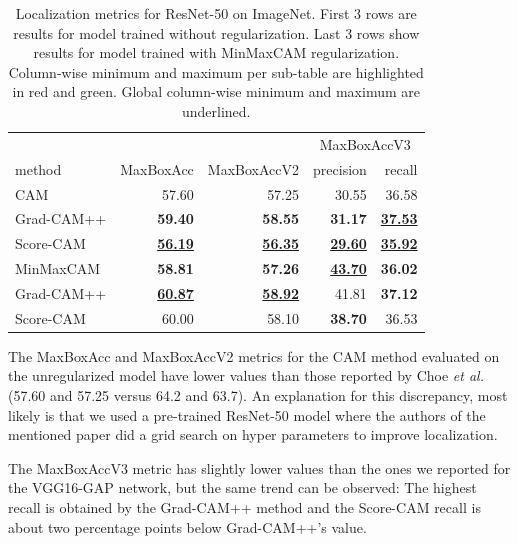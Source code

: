 \begin{table}[h]
\centering
\begin{tabular}{lrrrr}
\toprule
 & & & \multicolumn{2}{c}{MaxBoxAccV3} \\
method & MaxBoxAcc & MaxBoxAccV2 & precision & recall \\
\cmidrule(lr){1-1} \cmidrule(lr){2-5}
CAM & 57.60 & 57.25 & 30.55 & 36.58 \\
Grad-CAM++ & \color{teal} \bfseries 59.40 & \color{teal} \bfseries 58.55 & \color{teal} \bfseries 31.17 & \color{teal} \bfseries \underline{37.53} \\
Score-CAM & \color{purple} \bfseries \underline{56.19} & \color{purple} \bfseries \underline{56.35} & \color{purple} \bfseries \underline{29.60} & \color{purple} \bfseries \underline{35.92} \\
\cmidrule(lr){1-1} \cmidrule(lr){2-5}
MinMaxCAM & \color{purple} \bfseries 58.81 & \color{purple} \bfseries 57.26 & \color{teal} \bfseries \underline{43.70} & \color{purple} \bfseries 36.02 \\
Grad-CAM++ & \color{teal} \bfseries \underline{60.87} & \color{teal} \bfseries \underline{58.92} & 41.81 & \color{teal} \bfseries 37.12 \\
Score-CAM & 60.00 & 58.10 & \color{purple} \bfseries 38.70 & 36.53 \\
\bottomrule
\end{tabular}
\caption[Localization metrics for ResNet-50 on ImageNet]{Localization metrics for ResNet-50 on ImageNet. First 3 rows are results for model trained without regularization. Last 3 rows show results for model trained with MinMaxCAM regularization. Column-wise minimum and maximum per sub-table are highlighted in red and green. Global column-wise minimum and maximum are underlined.}
\label{tab:metrics_resnet50_imagenet}
\end{table}

The MaxBoxAcc and MaxBoxAccV2 metrics for the CAM method evaluated on the unregularized model have lower values than those reported by Choe \textit{et al.} \cite{choe2020evaluating} (57.60 and 57.25 versus 64.2 and 63.7). An explanation for this discrepancy, most likely is that we used a pre-trained ResNet-50 model where the authors of the mentioned paper did a grid search on hyper parameters to improve localization. 

The MaxBoxAccV3 metric has slightly lower values than the ones we reported for the VGG16-GAP network, but the same trend can be observed: The highest recall is obtained by the Grad-CAM++ method and the Score-CAM recall is about two percentage points below Grad-CAM++'s value. 

